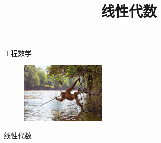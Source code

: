 \documentclass[adobefonts,11pt,a4papaper]{ctexbook}
\title{线性代数}
\begin{document}
\begin{titlepage} %
\vspace*{20pt}
\centerline{\LARGE 工程数学}
\begin{figure}
  \includegraphics[height=85pt]{head.jpg}
\end{figure}
\centerline{\LARGE 线性代数}
\end{titlepage}
\tableofcontents


\end{document}
